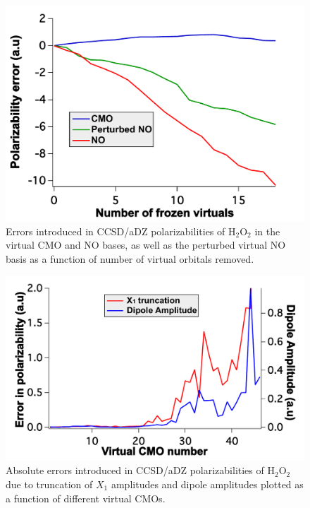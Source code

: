 \begin{figure}
  \centering
  \includegraphics[width=0.6\linewidth]{figures/perturbed.pdf}
  \caption{\footnotesize{Errors introduced in CCSD/aDZ polarizabilities of
H$_2$O$_2$ in the virtual CMO and NO bases, as well as the perturbed
virtual NO basis as a function of number of virtual orbitals removed.}}
   \label{fig:perturb}
\end{figure}
\begin{figure}
  \centering
  \includegraphics[width=0.6\linewidth]{figures/diplength.pdf}
  \caption{\footnotesize{Absolute errors introduced in CCSD/aDZ
  polarizabilities of H$_2$O$_2$ due to truncation of $X_1$ amplitudes and
  dipole amplitudes plotted as a function of different virtual CMOs.}}
   \label{fig:dipole_length}
\end{figure}
